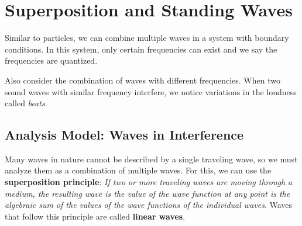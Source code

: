 \chapter{Superposition and Standing Waves}

Similar to particles, we can combine multiple waves in a system
with boundary conditions. In this system, only certain frequencies
can exist and we say the frequencies are quantized. 

Also consider the combination of waves with different frequencies.
When two sound waves with similar frequency interfere, we notice 
variations in the loudness called \textit{beats}.

\section{Analysis Model: Waves in Interference}

Many waves in nature cannot be described by a single traveling wave, 
so we must analyze them as a combination of multiple waves. For this,
we can use the \textbf{superposition principle}: \textit{If two or
more traveling waves are moving through a medium, the resulting
wave is the value of the wave function at any point is the algebraic
sum of the values of the wave functions of the individual waves}.
Waves that follow this principle are called \textbf{linear waves}.